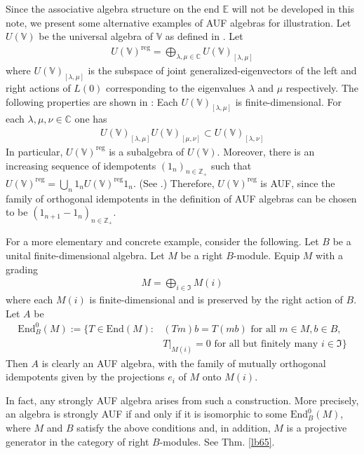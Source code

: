 \documentclass[11pt,b5paper,notitlepage]{article}
\theoremstyle{definition}
\theoremstyle{plain}
\newcommand{\fk}{\mathfrak}
\newcommand{\End}{\mathrm{End}} %
\newcommand{\Vbb}{\mathbb V}
\newcommand{\Cbb}{\mathbb C}
\newcommand{\Zbb}{\mathbb Z}
\newcommand{\Ebb}{\mathbb E}
\numberwithin{equation}{section}
\begin{document}
Since the associative algebra structure on the end $\Ebb$ will not be developed in this note, we present some alternative examples of AUF algebras for illustration. Let $U(\Vbb)$ be the universal algebra of $\Vbb$ as defined in \cite{FZ92-universal-alg}. Let
\begin{align*}
U(\Vbb)^{\mathrm{reg}}=\bigoplus_{\lambda,\mu\in\Cbb}U(\Vbb)_{[\lambda,\mu]}
\end{align*}
where $U(\Vbb)_{[\lambda,\mu]}$ is the subspace of joint generalized-eigenvectors of the left and right actions of $L(0)$ corresponding to the eigenvalues $\lambda$ and $\mu$ respectively. The following properties are shown in \cite{MNT10}: Each $U(\Vbb)_{[\lambda,\mu]}$ is finite-dimensional. For each $\lambda,\mu,\nu\in\Cbb$ one has
\begin{align*}
U(\Vbb)_{[\lambda,\mu]}U(\Vbb)_{[\mu,\nu]}\subset U(\Vbb)_{[\lambda,\nu]}
\end{align*}
In particular, $U(\Vbb)^{\mathrm{reg}}$ is a subalgebra of $U(\Vbb)$. Moreover, there is an increasing sequence of idempotents $(1_n)_{n\in\Zbb_+}$ such that $U(\Vbb)^{\mathrm{reg}}=\bigcup_n1_nU(\Vbb)^{\mathrm{reg}}1_n$. (See \cite[Sec. 2.6]{MNT10}.) Therefore, $U(\Vbb)^{\mathrm{reg}}$ is AUF, since the family of orthogonal idempotents in the definition of AUF algebras can be chosen to be $(1_{n+1}-1_n)_{n\in\Zbb_+}$.


For a more elementary and concrete example, consider the following. Let $B$ be a unital finite-dimensional algebra. Let $M$ be a right $B$-module. Equip $M$ with a grading
\begin{align*}
M=\bigoplus_{i\in\fk I}M(i)
\end{align*}
where each $M(i)$ is finite-dimensional and is preserved by the right action of $B$. Let $A$ be
\begin{align*}
\End^0_B(M):=\{T\in\End(M):&(Tm)b=T(mb)\text{ for all $m\in M,b\in B$,}\\
&T|_{M(i)}=0\text{ for all but finitely many }i\in\fk I \}
\end{align*}
Then $A$ is clearly an AUF algebra, with the family of mutually orthogonal idempotents given by the projections $e_i$ of $M$ onto $M(i)$. 

In fact, any strongly AUF algebra arises from such a construction. More precisely, an algebra is strongly AUF if and only if it is isomorphic to some $\End^0_B(M)$, where $M$ and $B$ satisfy the above conditions and, in addition, $M$ is a projective generator in the category of right $B$-modules. See Thm. \ref{lb65}.
\end{document}

